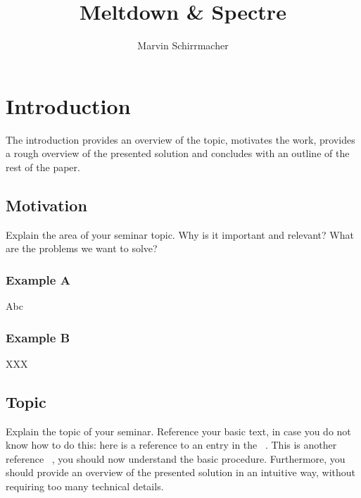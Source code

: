 \documentclass[a4paper,oneside,openright] {scrreprt}
\title{\Huge Meltdown \& Spectre}
\author{\Large Marvin Schirrmacher}
\begin{document}


\pagestyle{plain}
\cleardoublepage
{}
\tableofcontents
\clearpage
{}


\chapter{Introduction}  
\label{ch:intro}

The introduction provides an overview of the topic, motivates the work,
provides a rough overview of the presented solution and concludes with
an outline of the rest of the paper.

\section{Motivation}
\label{ch:intro:motivation}

Explain the area of your seminar topic. Why is it important and
relevant? What are the problems we want to solve?

\subsection{Example A}
\label{ch:intro:motivation:A}

Abc

\subsection{Example B}
\label{ch:intro:motivation:B}

XXX


\section{Topic} %
\label{ch:intro:topic}

Explain the topic of your seminar. Reference your basic text, in case
you do not know how to do this: here is a reference to an entry in the
~\cite{Rivest:83:RSA}. This is another
reference ~\cite{Garfinkel:03:VMI}, you should now understand the basic
procedure. Furthermore, you should provide an overview of the presented
solution in an intuitive way, without requiring too many technical
details.
\end{document}
